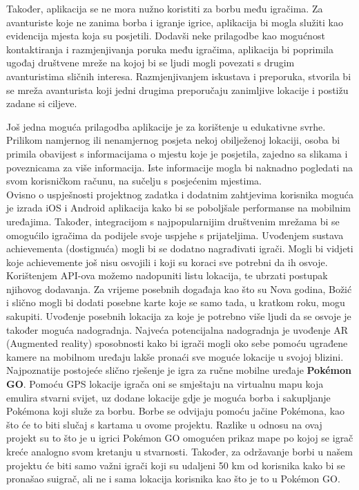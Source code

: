 		\textnormal{Također, aplikacija se ne mora nužno koristiti za borbu među igračima. Za avanturiste koje ne zanima borba i igranje igrice, aplikacija bi mogla služiti kao evidencija mjesta koja su posjetili. Dodavši neke prilagodbe kao mogućnost kontaktiranja i razmjenjivanja poruka među igračima, aplikacija  bi poprimila ugođaj društvene mreže na kojoj bi se ljudi mogli povezati s drugim avanturistima sličnih interesa. Razmjenjivanjem iskustava i preporuka, stvorila bi se mreža avanturista koji jedni drugima preporučaju zanimljive lokacije i postižu zadane si ciljeve.}
		
		\textnormal{Još jedna moguća  prilagodba aplikacije je za korištenje u edukativne svrhe. Prilikom namjernog ili nenamjernog posjeta nekoj obilježenoj lokaciji, osoba bi primila obavijest s informacijama o mjestu koje je posjetila, zajedno sa slikama i poveznicama za više informacija. Iste informacije mogla bi naknadno pogledati na svom korisničkom računu, na sučelju s posjećenim mjestima.}\\
		
		\textnormal{Ovisno o uspješnosti projektnog zadatka i dodatnim zahtjevima korisnika moguća je izrada iOS i Android aplikacija kako bi se poboljšale performanse na mobilnim uređajima. Također, integracijom s najpopularnijim društvenim mrežama bi se omogućilo igračima da podijele svoje uspjehe s prijateljima. Uvođenjem sustava achievementa (dostignuća) mogli bi se dodatno nagrađivati igrači. Mogli bi vidjeti koje achievemente još nisu osvojili i koji su koraci sve potrebni da ih osvoje. Korištenjem API-ova možemo nadopuniti listu lokacija, te ubrzati postupak njihovog dodavanja. Za vrijeme posebnih događaja kao što su Nova godina, Božić i slično mogli bi dodati posebne karte koje se samo tada, u kratkom roku, mogu sakupiti. Uvođenje posebnih lokacija za koje je potrebno više ljudi da se osvoje je također moguća nadogradnja. Najveća potencijalna nadogradnja je uvođenje AR (Augmented reality) sposobnosti kako bi igrači mogli oko sebe pomoću ugrađene kamere na mobilnom uređaju lakše pronaći sve moguće lokacije u svojoj blizini.}\\
		
		
		\textnormal{Najpoznatije postojeće slično rješenje je igra za ručne mobilne uređaje \textbf{Pokémon GO}. Pomoću GPS lokacije igrača oni se smještaju na virtualnu mapu koja emulira stvarni svijet, uz dodane lokacije gdje je moguća borba i sakupljanje Pokémona koji služe za borbu. Borbe se odvijaju pomoću jačine Pokémona, kao što će to biti slučaj s kartama u ovome projektu. Razlike u odnosu na ovaj projekt su to što je u igrici Pokémon GO omogućen prikaz mape po kojoj se igrač kreće analogno svom kretanju u stvarnosti. Također, za održavanje borbi u našem projektu će biti samo važni igrači koji su udaljeni 50 km od korisnika kako bi se pronašao suigrač, ali ne i sama lokacija korisnika kao što je to u Pokémon GO.    }
		
